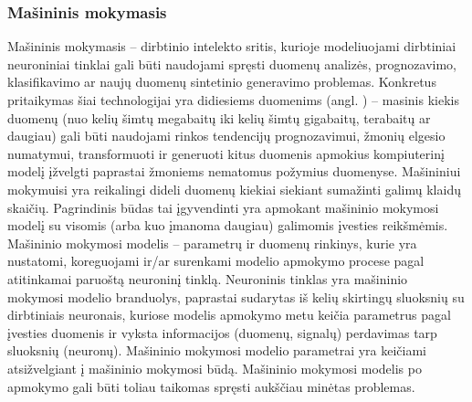 \documentclass{VUMIFInfBakalaurinis}
\begin{document}
\subsubsection{Mašininis mokymasis}
Mašininis mokymasis -- dirbtinio intelekto sritis, kurioje modeliuojami 
dirbtiniai neuroniniai tinklai gali būti naudojami spręsti duomenų analizės, 
prognozavimo, klasifikavimo ar naujų duomenų sintetinio generavimo problemas. 
Konkretus pritaikymas šiai technologijai yra didiesiems duomenims (angl. 
) -- masinis kiekis duomenų (nuo kelių šimtų megabaitų iki 
kelių šimtų gigabaitų, terabaitų ar daugiau) gali būti naudojami rinkos 
tendencijų prognozavimui, žmonių elgesio numatymui, transformuoti ir generuoti 
kitus duomenis apmokius kompiuterinį modelį įžvelgti paprastai žmoniems 
nematomus požymius duomenyse. Mašininiui mokymuisi yra reikalingi dideli duomenų 
kiekiai siekiant sumažinti galimų klaidų skaičių. Pagrindinis būdas tai 
įgyvendinti yra apmokant mašininio mokymosi modelį su visomis (arba kuo įmanoma 
daugiau) galimomis įvesties reikšmėmis. Mašininio mokymosi modelis -- parametrų 
ir duomenų rinkinys, kurie yra nustatomi, koreguojami ir/ar surenkami modelio 
apmokymo procese pagal atitinkamai paruoštą neuroninį tinklą. Neuroninis tinklas 
yra mašininio mokymosi modelio branduolys, paprastai sudarytas iš kelių 
skirtingų sluoksnių su dirbtiniais neuronais, kuriose modelis apmokymo metu 
keičia parametrus pagal įvesties duomenis ir vyksta informacijos (duomenų, 
signalų) perdavimas tarp sluoksnių (neuronų). Mašininio mokymosi modelio 
parametrai yra keičiami atsižvelgiant į mašininio mokymosi būdą. Mašininio 
mokymosi modelis po apmokymo gali būti toliau taikomas spręsti aukščiau minėtas 
problemas.
\end{document}
